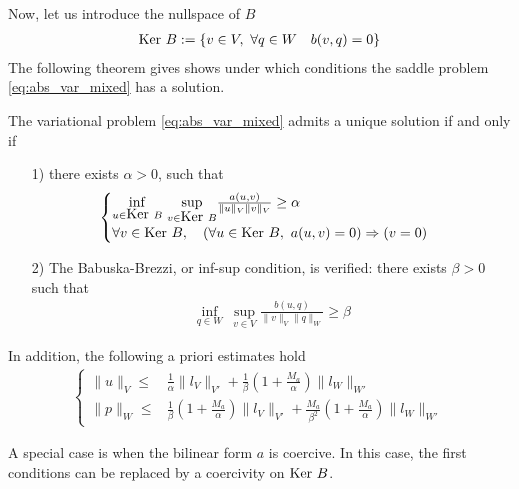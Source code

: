Now, let us introduce the nullspace of $B$
\begin{align}
  \mbox{Ker}~ B := \{ v \in V, ~\forall q \in W \quad b(v,q) = 0 \}  
\end{align}
The following theorem gives shows under which conditions the saddle problem \eqref{eq:abs_var_mixed} has a solution.
\begin{theorem}
  The variational problem \eqref{eq:abs_var_mixed} admits a unique solution if and only if
\begin{itemize}
\item[1)] there exists $\alpha > 0$, such that 
  \begin{align}
    \begin{cases}
      \underset{u \in \mbox{Ker}~ B}{\inf} ~ \underset{v \in \mbox{Ker}~ B}{\sup}
      \frac{a(u,v)}{\| u \|_V \| v \|_V} \geq \alpha
      \\
      \forall v \in \mbox{Ker}~ B, \quad \left( \forall u \in \mbox{Ker}~ B, ~ a(u,v) = 0 \right) \Rightarrow (v = 0)
    \end{cases}
  \end{align}

\item[2)] The Babuska-Brezzi, or inf-sup condition, is verified:  there exists $\beta>0$ such that
  \begin{align}
      \underset{q \in W}{\inf} ~ \underset{v \in V}{\sup}
      \frac{b(u,q)}{\| v \|_V \| q \|_W} \geq \beta
  \end{align}
\end{itemize}
In addition, the following a priori estimates hold
\begin{align}
  \left\{ 
  \begin{array}{cl}
    \|u\|_V  \leq & \frac{1}{\alpha} \|l_V\|_{V'} + \frac{1}{\beta}(1+ \frac{M_a}{\alpha})  \|l_W\|_{W'}
    \\
    \|p\|_W  \leq & \frac{1}{\beta}(1+ \frac{M_a}{\alpha})  \|l_V\|_{V'} + \frac{M_a}{\beta^2}(1+ \frac{M_a}{\alpha})  \|l_W\|_{W'}
  \end{array} \right.
\end{align}

\end{theorem}
A special case is when the bilinear form $a$ is coercive. In this case, the first conditions can be replaced by a coercivity on $\mbox{Ker}~ B$.


